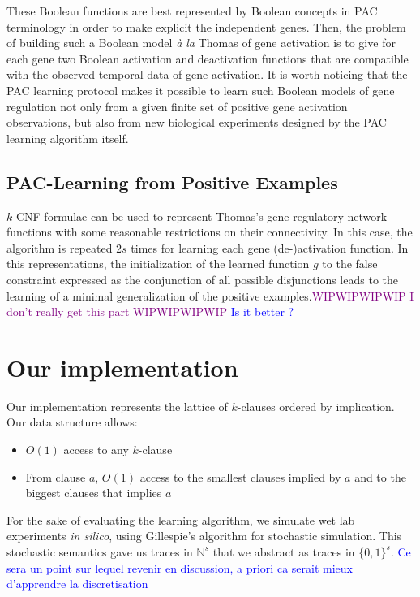 \documentclass{llncs}
\newcommand{\wip}[1]{\textcolor{Purple}{WIPWIPWIPWIP #1 WIPWIPWIPWIP}}
\newcommand{\francois}[1]{\textcolor{blue}{#1}}
\begin{document}
  These Boolean functions are best represented by Boolean concepts in PAC terminology
  in order to make explicit the independent genes.
  Then, the problem of building such a Boolean model \emph{\`a la} Thomas of gene activation is to give for each gene
  two Boolean activation and deactivation functions that are compatible with the observed temporal data of gene activation.
It is worth noticing that the PAC learning protocol makes it possible to learn such Boolean models of gene regulation
not only from a given finite set of positive gene activation observations,
but also from new biological experiments designed by the PAC learning algorithm itself.

\subsection{PAC-Learning from Positive Examples}

$k$-CNF formulae can be used to represent Thomas's gene regulatory network functions with some reasonable restrictions on their connectivity.
In this case, the algorithm is repeated $2s$ times for learning each gene (de-)activation function.
In this representations, the initialization of the learned function $g$ to the false constraint expressed as the conjunction of all possible disjunctions
leads to the learning of a minimal generalization of the positive examples.\wip{I don't really get this part}
\francois{Is it better ?}

\section{Our implementation}
Our implementation represents the lattice of $k$-clauses ordered by implication. Our data structure allows:
\begin{itemize}
	\item $O(1)$ access to any $k$-clause
	\item From clause $a$, $O(1)$ access to the smallest clauses implied by $a$ and to the biggest clauses that implies $a$
\end{itemize}

For the sake of evaluating the learning algorithm, 
we simulate wet lab experiments \emph{in silico}, using Gillespie's algorithm for stochastic simulation. 
This stochastic semantics gave us traces in $\mathbb{N}^s$ that we abstract as traces in $\{0,1\}^s$.
\francois{Ce sera un point sur lequel revenir en discussion, a priori ca serait mieux d'apprendre la discretisation}
\end{document}
